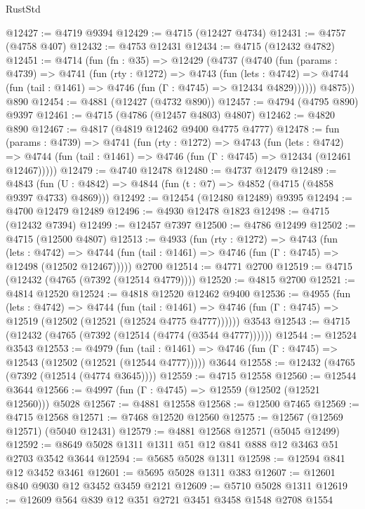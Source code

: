 \begin{lexlean}{RustStd}
\begin{coremodule}
@12427 := @4719 @9394
@12429 := @4715 (@12427 @4734)
@12431 := @4757 (@4758 @407)
@12432 := @4753 @12431
@12434 := @4715 (@12432 @4782)
@12451 := @4714
    (fun (fn : @35) =>
    @12429
      (@4737
        (@4740
          (fun (params : @4739) =>
          @4741
            (fun (rty : @1272) =>
            @4743
              (fun (lets : @4742) =>
              @4744 (fun (tail : @1461) => @4746 (fun (Γ : @4745) => @12434 @4829))))))
        @4875))
    @890
@12454 := @4881 (@12427 (@4732 @890))
@12457 := @4794 (@4795 @890) @9397
@12461 := @4715 (@4786 (@12457 @4803) @4807)
@12462 := @4820 @890
@12467 := @4817 (@4819 @12462 @9400 @4775 @4777)
@12478 := fun (params : @4739) =>
  @4741
    (fun (rty : @1272) =>
    @4743
      (fun (lets : @4742) =>
      @4744 (fun (tail : @1461) => @4746 (fun (Γ : @4745) => @12434 (@12461 @12467)))))
@12479 := @4740 @12478
@12480 := @4737 @12479
@12489 := @4843 (fun (U : @4842) => @4844 (fun (t : @7) => @4852 (@4715 (@4858 @9397 @4733) @4869)))
@12492 := @12454 (@12480 @12489) @9395
@12494 := @4700 @12479 @12489
@12496 := @4930 @12478 @1823
@12498 := @4715 (@12432 @7394)
@12499 := @12457 @7397
@12500 := @4786 @12499
@12502 := @4715 (@12500 @4807)
@12513 := @4933
    (fun (rty : @1272) =>
    @4743
      (fun (lets : @4742) =>
      @4744 (fun (tail : @1461) => @4746 (fun (Γ : @4745) => @12498 (@12502 @12467)))))
    @2700
@12514 := @4771 @2700
@12519 := @4715 (@12432 (@4765 (@7392 (@12514 @4779))))
@12520 := @4815 @2700
@12521 := @4814 @12520
@12524 := @4818 @12520 @12462 @9400
@12536 := @4955
    (fun (lets : @4742) =>
    @4744
      (fun (tail : @1461) =>
      @4746 (fun (Γ : @4745) => @12519 (@12502 (@12521 (@12524 @4775 @4777))))))
    @3543
@12543 := @4715 (@12432 (@4765 (@7392 (@12514 (@4774 (@3544 @4777))))))
@12544 := @12524 @3543
@12553 := @4979
    (fun (tail : @1461) => @4746 (fun (Γ : @4745) => @12543 (@12502 (@12521 (@12544 @4777)))))
    @3644
@12558 := @12432 (@4765 (@7392 (@12514 (@4774 @3645))))
@12559 := @4715 @12558
@12560 := @12544 @3644
@12566 := @4997 (fun (Γ : @4745) => @12559 (@12502 (@12521 @12560))) @5028
@12567 := @4881 @12558
@12568 := @12500 @7465
@12569 := @4715 @12568
@12571 := @7468 @12520 @12560
@12575 := @12567 (@12569 @12571) (@5040 @12431)
@12579 := @4881 @12568 @12571 (@5045 @12499)
@12592 := @8649 @5028 @1311 @1311 @51 @12 @841 @888 @12 @3463 @51 @2703 @3542 @3644
@12594 := @5685 @5028 @1311
@12598 := @12594 @841 @12 @3452 @3461
@12601 := @5695 @5028 @1311 @383
@12607 := @12601 @840 @9030 @12 @3452 @3459 @2121
@12609 := @5710 @5028 @1311
@12619 := @12609 @564 @839 @12 @351 @2721 @3451 @3458 @1548 @2708 @1554

\end{coremodule}
\end{lexlean}
